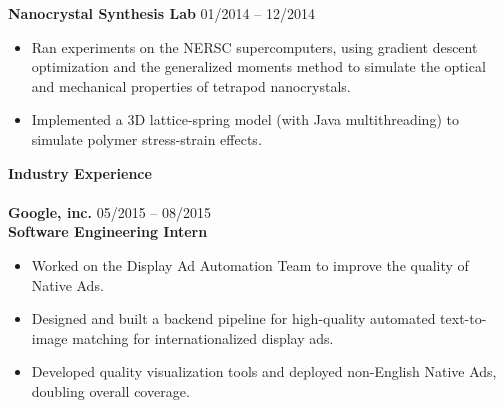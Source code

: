 \documentclass{article}
\begin{document}
\noindent
\textbf{Nanocrystal Synthesis Lab}
\hfill 01/2014 -- 12/2014
\begin{itemize}
\vspace{-2.5mm}
\item Ran experiments on the NERSC supercomputers, using gradient descent optimization and the generalized moments method to simulate the optical and mechanical properties of tetrapod nanocrystals.
\vspace{-2.5mm}
\item Implemented a 3D lattice-spring model (with Java multithreading) to simulate polymer stress-strain effects.
\end{itemize}

\noindent
\textbf{{\Large Industry Experience}}\\[-2mm]
\HRule\\
\textbf{Google, inc.}
\hfill 05/2015 -- 08/2015\\
\textbf{Software Engineering Intern}
\begin{itemize}
\vspace{-2.5mm}
\item Worked on the Display Ad Automation Team to improve the quality of Native Ads.
\vspace{-2.5mm}
\item Designed and built a backend pipeline for high-quality automated text-to-image matching for internationalized display ads.
\vspace{-2.5mm}
\item Developed quality visualization tools and deployed non-English Native Ads, doubling overall coverage.
\end{itemize}
\vspace{1mm}
\end{document}
